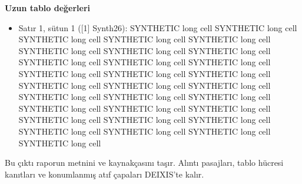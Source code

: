 \documentclass[journal]{IEEEtran}
\begin{document}
\noindent\textbf{Uzun tablo değerleri}

\begin{itemize}
\item[1.] Satır 1, sütun 1 ([1] Synth26): SYNTHETIC long cell SYNTHETIC long cell SYNTHETIC long cell SYNTHETIC long cell SYNTHETIC long cell SYNTHETIC long cell SYNTHETIC long cell SYNTHETIC long cell SYNTHETIC long cell SYNTHETIC long cell SYNTHETIC long cell SYNTHETIC long cell SYNTHETIC long cell SYNTHETIC long cell SYNTHETIC long cell SYNTHETIC long cell SYNTHETIC long cell SYNTHETIC long cell SYNTHETIC long cell SYNTHETIC long cell SYNTHETIC long cell SYNTHETIC long cell SYNTHETIC long cell SYNTHETIC long cell SYNTHETIC long cell SYNTHETIC long cell SYNTHETIC long cell SYNTHETIC long cell SYNTHETIC long cell SYNTHETIC long cell
\end{itemize}

Bu çıktı raporun metnini ve kaynakçasını taşır. Alıntı pasajları, tablo hücresi kanıtları ve konumlanmış atıf çapaları DEIXIS'te kalır.




\end{document}
